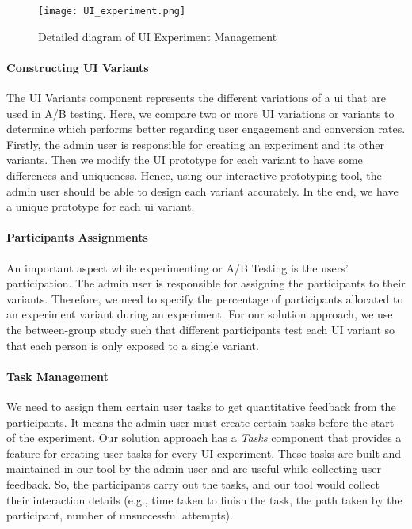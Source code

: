 \begin{figure}[htbp!]
    \centering    
    \texttt{[image: UI\_experiment.png]} 
    \caption[Details of UI Experiment Management]{Detailed diagram of UI Experiment Management}
    \label{fig:sc:experiments}
\end{figure}

\paragraph{Constructing UI Variants}
The UI Variants component represents the different variations of a \ac{ui} that are used in A/B testing. 
Here, we compare two or more UI variations or variants to determine which performs better regarding user engagement and conversion rates. 
Firstly, the admin user is responsible for creating an experiment and its other variants. 
Then we modify the UI prototype for each variant to have some differences and uniqueness. 
Hence, using our interactive prototyping tool, the admin user should be able to design each variant accurately.
In the end, we have a unique prototype for each \ac{ui} variant.

\paragraph{Participants Assignments}
An important aspect while experimenting or A/B Testing is the users' participation. 
The admin user is responsible for assigning the participants to their variants. 
Therefore, we need to specify the percentage of participants allocated to an experiment variant during an experiment. 
For our solution approach, we use the between-group study such that different participants test each UI variant so that each person is only exposed to a single variant. 

\paragraph{Task Management}
We need to assign them certain user tasks to get quantitative feedback from the participants. 
It means the admin user must create certain tasks before the start of the experiment.
Our solution approach has a \textit{Tasks} component that provides a feature for creating user tasks for every UI experiment. 
These tasks are built and maintained in our tool by the admin user and are useful while collecting user feedback. 
So, the participants carry out the tasks, and our tool would collect their interaction details (e.g., time taken to finish the task, the path taken by the participant, number of unsuccessful attempts). 

